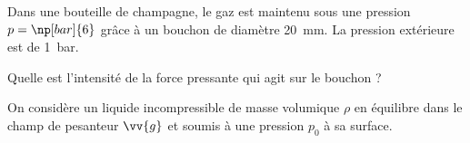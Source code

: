Dans une bouteille de champagne, le gaz est maintenu sous une pression $p=\np[bar]{6}$ grâce à un bouchon de diamètre 20~mm. La pression extérieure est de 1~bar. 

\debutEntrainement


\begin{enonce}
Quelle est l'intensité de la force pressante qui agit sur le bouchon ?
\end{enonce}





\finEntrainement










\hauteurLargeurCadreReponse		{8mm}{1.5cm}
\initialisationEntrainement

                                \initialisationPartieGauche %
On considère un liquide incompressible de masse volumique $\rho$ en équilibre dans le champ de pesanteur $\vv{g}$ et soumis à une pression $p_0$ à sa surface.
	
